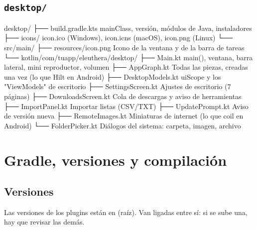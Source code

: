 \documentclass[11pt,a4paper,oneside]{report}
\newcommand{\ruta}[1]{{\small\path{#1}}}
\newcommand{\cod}[1]{\texttt{\small #1}}
\begin{document}
\section{\texorpdfstring{\cod{desktop/}}{desktop/}}

\begin{arbol}
\begin{literal}
desktop/
├── build.gradle.kts               mainClass, versión, módulos de Java, instaladores
├── icons/                         icon.ico (Windows), icon.icns (macOS), icon.png (Linux)
└── src/main/
    ├── resources/icon.png         Icono de la ventana y de la barra de tareas
    └── kotlin/com/tuapp/eleuthera/desktop/
        ├── Main.kt                main(), ventana, barra lateral, mini reproductor, volumen
        ├── AppGraph.kt            Todas las piezas, creadas una vez (lo que Hilt en Android)
        ├── DesktopModels.kt       uiScope y los "ViewModels" de escritorio
        ├── SettingsScreen.kt      Ajustes de escritorio (7 páginas)
        ├── DownloadsScreen.kt     Cola de descargas y aviso de herramientas
        ├── ImportPanel.kt         Importar listas (CSV/TXT)
        ├── UpdatePrompt.kt        Aviso de versión nueva
        ├── RemoteImages.kt        Miniaturas de internet (lo que coil en Android)
        └── FolderPicker.kt        Diálogos del sistema: carpeta, imagen, archivo
\end{literal}
\end{arbol}

\chapter{Gradle, versiones y compilación}

\section{Versiones}

Las versiones de los plugins están en \ruta{build.gradle.kts} (raíz). Van ligadas entre sí:
si se sube una, hay que revisar las demás.
\end{document}
